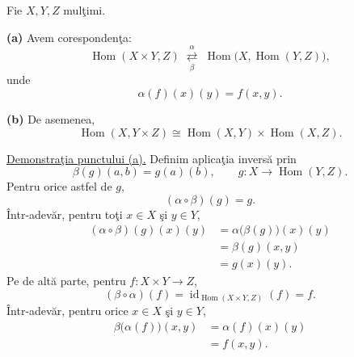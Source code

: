 \bigskip
\noindent{}\quad Fie $X,Y,Z$ mulţimi.

\medskip
\noindent\textbf{(a)} Avem corespondenţa:
\[
 \operatorname{Hom}(X\times Y,Z)
 \;\overset{\alpha}{\underset{\beta}{\rightleftarrows}}\;
 \operatorname{Hom}\bigl(X,\operatorname{Hom}(Y,Z)\bigr),
\]
unde
\[
 \alpha(f)(x)(y)=f(x,y).
\]

\noindent\textbf{(b)} De asemenea,
\[
 \operatorname{Hom}(X,Y\times Z)
 \cong\operatorname{Hom}(X,Y)\times\operatorname{Hom}(X,Z).
\]

\medskip
\noindent\underline{Demonstraţia punctului (a).}
Definim aplicaţia inversă prin
\[
 \beta(g)(a,b)=g(a)(b),\qquad
 g:X\longrightarrow\operatorname{Hom}(Y,Z).
\]
Pentru orice astfel de $g$,
\[
 (\alpha\circ\beta)(g)=g.
\]
Într-adevăr, pentru toţi $x\in X$ şi $y\in Y$,
\[
 \begin{aligned}
 (\alpha\circ\beta)(g)(x)(y)
 &=\alpha\bigl(\beta(g)\bigr)(x)(y)\\
 &=\beta(g)(x,y)\\
 &=g(x)(y).
 \end{aligned}
\]
Pe de altă parte, pentru $f:X\times Y\longrightarrow Z$,
\[
 (\beta\circ\alpha)(f)=\operatorname{id}_{\operatorname{Hom}(X\times Y,Z)}(f)=f.
\]
Într-adevăr, pentru orice $x\in X$ şi $y\in Y$,
\[
 \begin{aligned}
 \beta\bigl(\alpha(f)\bigr)(x,y)
 &=\alpha(f)(x)(y)\\
 &=f(x,y).
 \end{aligned}
\]
